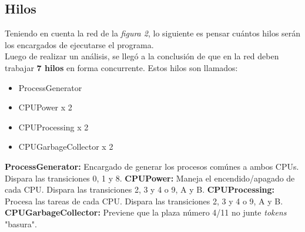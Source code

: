 \documentclass{article}
\begin{document}
    \subsection{Hilos}
    \begin{flushleft}
        Teniendo en cuenta la red de la \emph{figura 2}, lo siguiente es pensar cuántos hilos
        serán los encargados de ejecutarse el programa. \\
        Luego de realizar un análisis, se llegó a la conclusión de que en la red deben trabajar
        \textbf{7 hilos} en forma concurrente. Estos hilos son llamados:
        \begin{itemize}
            \item ProcessGenerator
            \item CPUPower x 2
            \item CPUProcessing x 2
            \item CPUGarbageCollector x 2
        \end{itemize}
        \textbf{ProcessGenerator:} Encargado de generar los procesos comúnes a ambos CPUs. 
        Dispara las transiciones 0, 1 y 8. \newline \newline
        \textbf{CPUPower:} Maneja el encendido/apagado de cada CPU. Dispara las transiciones
        2, 3 y 4 o 9, A y B. \newline \newline
        \textbf{CPUProcessing:} Procesa las tareas de cada CPU. Dispara las transiciones
        2, 3 y 4 o 9, A y B. \newline \newline
        \textbf{CPUGarbageCollector:} Previene que la plaza número 4/11 no junte \emph{tokens}
        "basura". \newline \newline
    \end{flushleft}
\end{document}

